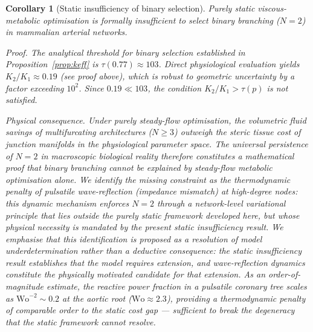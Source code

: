 \documentclass[11pt,a4paper]{article}
\newtheorem{corollary}[theorem]{Corollary}
\theoremstyle{remark}
\begin{document}
\begin{corollary}[Static insufficiency of binary selection]
\label{cor:static_insufficiency}
Purely static viscous-metabolic optimisation is formally insufficient
to select binary branching ($N=2$) in mammalian arterial networks.

\emph{Proof.}
The analytical threshold for binary selection established in
Proposition~\ref{prop:keff} is $\tau(0.77) \approx 103$.
Direct physiological evaluation yields $K_2/K_1 \approx 0.19$
(see proof above), which is robust to geometric uncertainty by a factor
exceeding $10^2$. Since $0.19 \ll 103$, the condition $K_2/K_1 >
\tau(p)$ is not satisfied.

\emph{Physical consequence.}
Under purely steady-flow optimisation, the volumetric fluid savings
of multifurcating architectures ($N \geq 3$) outweigh the steric
tissue cost of junction manifolds in the physiological parameter space.
The universal persistence of $N=2$ in macroscopic biological reality
therefore constitutes a mathematical proof that binary branching
cannot be explained by steady-flow metabolic optimisation alone. We
identify the missing constraint as the thermodynamic penalty of
pulsatile wave-reflection (impedance mismatch) at high-degree nodes:
this dynamic mechanism enforces $N=2$ through a network-level
variational principle that lies outside the purely static framework
developed here, but whose physical necessity is mandated by the
present static insufficiency result. We emphasise that this
identification is proposed as a resolution of model underdetermination
rather than a deductive consequence: the static insufficiency result
establishes that the model requires extension, and wave-reflection
dynamics constitute the physically motivated candidate for that
extension. As an order-of-magnitude estimate, the reactive power fraction in a
pulsatile coronary tree scales as $\mathrm{Wo}^{-2} \sim 0.2$ at the
aortic root ($\mathrm{Wo} \approx 2.3$), providing a thermodynamic
penalty of comparable order to the static cost gap — sufficient to
break the degeneracy that the static framework cannot resolve.
\end{corollary}
\end{document}
